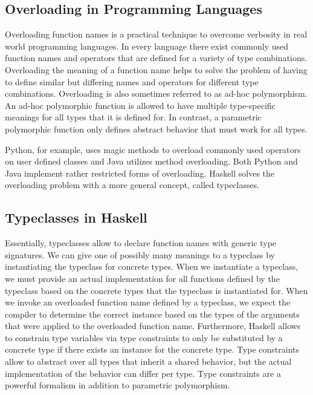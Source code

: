 \subsection{Overloading in Programming Languages}
Overloading function names is a practical technique to overcome verbosity in real world programming languages. 
In every language there exist commonly used function names and operators that are defined for a variety of type combinations.
Overloading the meaning of a function name helps to solve the problem of having to define similar but differing names and operators for different type combinations. 
Overloading is also sometimes referred to as ad-hoc polymorphism. 
An ad-hoc polymorphic function is allowed to have multiple type-specific meanings for all types that it is defined for. 
In contrast, a parametric polymorphic function only defines abstract behavior that must work for all types.

\noindent Python, for example, uses magic methods to overload commonly used operators on user defined classes and Java utilizes method overloading. 
Both Python and Java implement rather restricted forms of overloading. 
Haskell solves the overloading problem with a more general concept, called typeclasses.

\subsection{Typeclasses in Haskell}
Essentially, typeclasses allow to declare function names with generic type signatures.
We can give one of possibly many meanings to a typeclass by instantiating the typeclass for concrete types. 
When we instantiate a typeclass, we must provide an actual implementation for all functions defined by the typeclass based on the concrete types that the typeclass is instantiated for.
When we invoke an overloaded function name defined by a typeclass, we expect the compiler to determine the correct instance based on the types of the arguments that were applied to the overloaded function name. 
Furthermore, Haskell allows to constrain type variables via type constraints to only be substituted by a concrete type if there exists an instance for the concrete type. 
Type constraints allow to abstract over all types that inherit a shared behavior, but the actual implementation of the behavior can differ per type. Type constraints are a powerful formalism in addition to parametric polymorphism.

